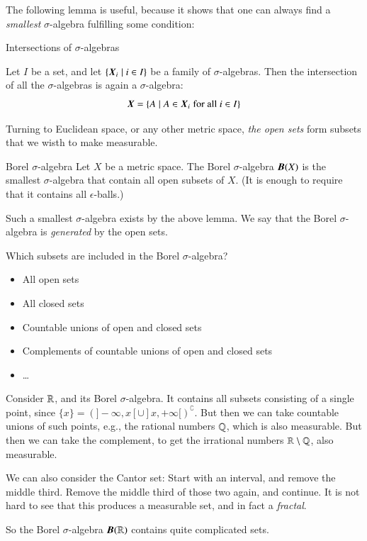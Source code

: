 The following lemma is useful, because it shows that one can always find a \emph{smallest} $\sigma$-algebra fulfilling some condition:
\begin{myLemma}{Intersections of $\sigma$-algebras}{}

    Let $I$ be a set, and let $\{\boldsymbol{X}_i \mid i \in I\}$ be a family of $\sigma$-algebras. Then the intersection of all the $\sigma$-algebras is again a $\sigma$-algebra:
    \begin{equation}
        \boldsymbol{X} = \left\{ A \mid A \in \boldsymbol{X}_i \; \text{for all $i\in I$} \right\}
    \end{equation}
\end{myLemma}

Turning to Euclidean space, or any other metric space, \emph{the open sets} form subsets that we wisth to make measurable.
\begin{myDefinition}{Borel $\sigma$-algebra}{}
    Let $X$ be a metric space. The Borel $\sigma$-algebra $\boldsymbol{B}(X)$ is the smallest $\sigma$-algebra that contain all open subsets of $X$. (It is enough to require that it contains all $\epsilon$-balls.)
\end{myDefinition}

Such a smallest $\sigma$-algebra exists by the above lemma. We say that the Borel $\sigma$-algebra is \emph{generated} by the open sets. 

Which subsets are included in the Borel $\sigma$-algebra?
\begin{itemize}
    \item All open sets
    \item All closed sets
    \item Countable unions of open and closed sets
    \item Complements of countable unions of open and closed sets
    \item \dots
\end{itemize}

\begin{myExample}{}{}
    Consider $\mathbb{R}$, and its Borel $\sigma$-algebra. It contains all subsets consisting of a single point, since $\{x\} = (]-\infty,x[ \cup ]x,+\infty[)^\complement$. But then we can take countable unions of such points, e.g., the rational numbers $\mathbb{Q}$, which is also measurable. But then we can take the complement, to get the irrational numbers $\mathbb{R}\setminus\mathbb{Q}$, also measurable.

    We can also consider the Cantor set: Start with an interval, and remove the middle third. Remove the middle third of those two again, and continue. It is not hard to see that this produces a measurable set, and in fact a \emph{fractal}. 

    So the Borel $\sigma$-algebra $\boldsymbol{B}(\mathbb{R})$ contains quite complicated sets.
\end{myExample}


